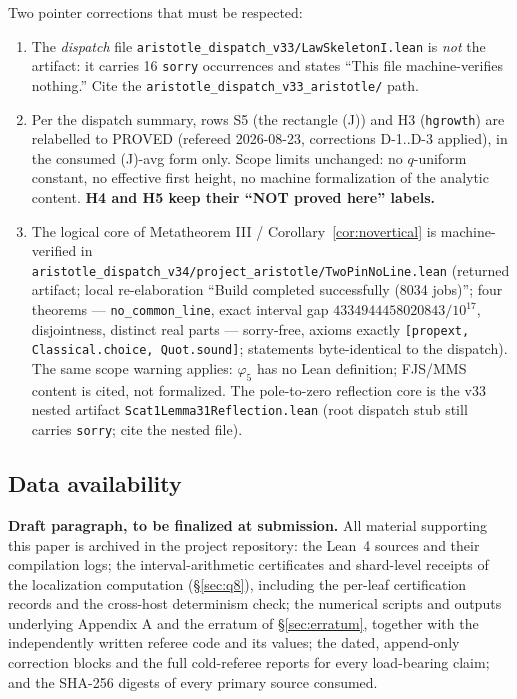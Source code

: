 \documentclass[11pt]{amsart}
\theoremstyle{remark}
\begin{document}
Two pointer corrections that must be respected:
\begin{enumerate}
\item The \emph{dispatch} file \texttt{aristotle\_dispatch\_v33/LawSkeletonI.lean}
is \emph{not} the artifact: it carries 16 \texttt{sorry} occurrences and
states ``This file machine-verifies nothing.'' Cite the
\texttt{aristotle\_dispatch\_v33\_aristotle/} path.
\item Per the dispatch summary, rows S5 (the rectangle (J)) and H3
(\texttt{hgrowth}) are relabelled to PROVED (refereed 2026-08-23,
corrections D-1..D-3 applied), in the consumed (J)-avg form only. Scope
limits unchanged: no $q$-uniform constant, no effective first height, no
machine formalization of the analytic content. \textbf{H4 and H5 keep
their ``NOT proved here'' labels.}
\item The logical core of Metatheorem III / Corollary~\ref{cor:novertical} is
machine-verified in
\texttt{aristotle\_dispatch\_v34/project\_aristotle/TwoPinNoLine.lean}
(returned artifact; local re-elaboration ``Build completed successfully
(8034 jobs)''; four theorems --- \texttt{no\_common\_line}, exact
interval gap $4334944458020843/10^{17}$, disjointness, distinct real
parts --- sorry-free, axioms exactly
\texttt{[propext, Classical.choice, Quot.sound]}; statements
byte-identical to the dispatch). The same scope warning applies:
$\varphi_5$ has no Lean definition; FJS/MMS content is cited, not
formalized. The pole-to-zero reflection core is the v33 nested artifact
\texttt{Scat1Lemma31Reflection.lean} (root dispatch stub still carries
\texttt{sorry}; cite the nested file).
\end{enumerate}

\subsection{Data availability}

\textbf{Draft paragraph, to be finalized at submission.} All material
supporting this paper is archived in the project repository: the Lean~4
sources and their compilation logs; the interval-arithmetic certificates
and shard-level receipts of the localization computation
(\S\ref{sec:q8}), including the per-leaf certification records and the
cross-host determinism check; the numerical scripts and outputs
underlying Appendix A and the erratum of \S\ref{sec:erratum}, together
with the independently written referee code and its values; the dated,
append-only correction blocks and the full cold-referee reports for
every load-bearing claim; and the SHA-256 digests of every primary
source consumed.
\end{document}
